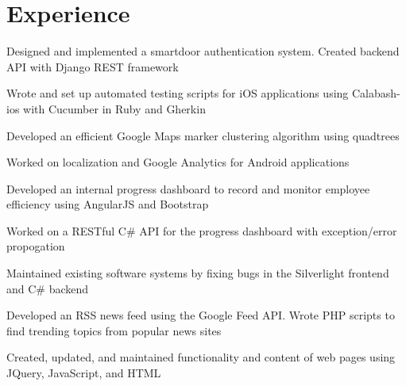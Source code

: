 \documentclass[]{peter_resume}
\begin{document}
\begin{minipage}[t]{0.66\textwidth} 


\section{Experience}

\vspace{\topsep} %
\begin{tightemize}
\item Designed and implemented a smartdoor authentication system. Created backend API with Django REST framework
\item Wrote and set up automated testing scripts for iOS applications using Calabash-ios with Cucumber in Ruby and Gherkin
\item Developed an efficient Google Maps marker clustering algorithm using quadtrees
\item Worked on localization and Google Analytics for Android applications
\end{tightemize}
\sectionsep

\begin{tightemize}
\item Developed an internal progress dashboard to record and monitor employee efficiency using AngularJS and Bootstrap
\item Worked on a RESTful C\# API for the progress dashboard with exception/error propogation
\item Maintained existing software systems by fixing bugs in the Silverlight frontend and C\# backend
\end{tightemize}
\sectionsep

\begin{tightemize}
\item Developed an RSS news feed using the Google Feed API. Wrote PHP scripts to find trending topics from popular news sites
\item Created, updated, and maintained functionality and content of web pages using JQuery, JavaScript, and HTML
\end{tightemize}
\sectionsep


\end{minipage}
\end{document}
